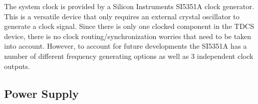 The system clock is provided by a Silicon Instruments SI5351A clock generator. This is a versatile device that only requires an external crystal oscillator to generate a clock signal. Since there is only one clocked component in the TDCS device, there is no clock routing/synchronization worries that need to be taken into account. However, to account for future developments the SI5351A has a number of different frequency generating options as well as 3 independent clock outputs. 



\subsection{Power Supply}




